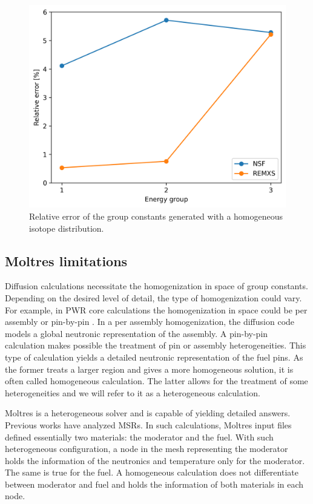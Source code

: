 \documentclass[11pt,letterpaper]{article}
\begin{document}
\begin{figure}[htbp!]
	\centering
	\includegraphics[width=0.45\linewidth]{figures/param-comparison}
	\hfill
	\caption{Relative error of the group constants generated with a homogeneous isotope distribution.}
	\label{fig:param-comparison}
\end{figure}

\subsection{Moltres limitations}

Diffusion calculations necessitate the homogenization in space of group constants.
Depending on the desired level of detail, the type of homogenization could vary.
For example, in PWR core calculations the homogenization in space could be per assembly or pin-by-pin \cite{krebs_calculational_1990}.
In a per assembly homogenization, the diffusion code models a global neutronic representation of the assembly.
A pin-by-pin calculation makes possible the treatment of pin or assembly heterogeneities.
This type of calculation yields a detailed neutronic representation of the fuel pins.
As the former treats a larger region and gives a more homogeneous solution, it is often called homogeneous calculation.
The latter allows for the treatment of some heterogeneities and we will refer to it as a heterogeneous calculation.

Moltres is a heterogeneous solver and is capable of yielding detailed answers.
Previous works \cite{lindsay_introduction_2018}\cite{pater_multiphysics_2019} have analyzed \glspl{MSR}.
In such calculations, Moltres input files defined essentially two materials: the moderator and the fuel.
With such heterogeneous configuration, a node in the mesh representing the moderator holds the information of the neutronics and temperature only for the moderator.
The same is true for the fuel.
A homogeneous calculation does not differentiate between moderator and fuel and holds the information of both materials in each node.
\end{document}
